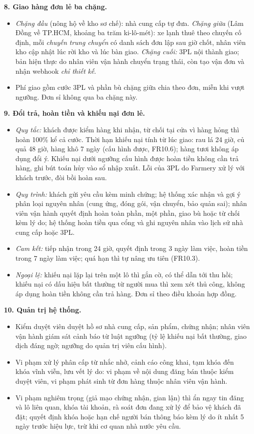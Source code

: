 \noindent\textbf{8. Giao hàng đơn lẻ ba chặng.}
\begin{itemize}
    \item \emph{Chặng đầu} (nông hộ về kho sơ chế): nhà cung cấp tự đưa. \emph{Chặng giữa} (Lâm Đồng về TP.HCM, khoảng ba trăm ki-lô-mét): xe lạnh thuê theo chuyến cố định, mỗi \emph{chuyến trung chuyển} có danh sách đơn lập sau giờ chốt, nhân viên kho cập nhật lúc rời kho và lúc bàn giao. \emph{Chặng cuối:} 3PL nội thành giao; bản hiện thực do nhân viên vận hành chuyển trạng thái, còn tạo vận đơn và nhận webhook \emph{chỉ thiết kế}.
    \item Phí giao gồm cước 3PL và phần bù chặng giữa chia theo đơn, miễn khi vượt ngưỡng. Đơn sỉ không qua ba chặng này.
\end{itemize}

\noindent\textbf{9. Đổi trả, hoàn tiền và khiếu nại đơn lẻ.}
\begin{itemize}
    \item \emph{Quy tắc:} khách được kiểm hàng khi nhận, từ chối tại cửa vì hàng hỏng thì hoàn 100\% kể cả cước. Thời hạn khiếu nại tính từ lúc giao: rau lá 24 giờ, củ quả 48 giờ, hàng khô 7 ngày (cấu hình được, FR10.6); hàng tươi không áp dụng đổi ý. Khiếu nại dưới ngưỡng cấu hình được hoàn tiền không cần trả hàng, ghi bút toán hủy vào sổ nhập xuất. Lỗi của 3PL do Farmery xử lý với khách trước, đòi bồi hoàn sau.
    \item \emph{Quy trình:} khách gửi yêu cầu kèm minh chứng; hệ thống xác nhận và gợi ý phân loại nguyên nhân (cung ứng, đóng gói, vận chuyển, bảo quản sai); nhân viên vận hành quyết định hoàn toàn phần, một phần, giao bù hoặc từ chối kèm lý do; hệ thống hoàn tiền qua cổng và ghi nguyên nhân vào lịch sử nhà cung cấp hoặc 3PL.
    \item \emph{Cam kết:} tiếp nhận trong 24 giờ, quyết định trong 3 ngày làm việc, hoàn tiền trong 7 ngày làm việc; quá hạn thì tự nâng ưu tiên (FR10.3).
    \item \emph{Ngoại lệ:} khiếu nại lặp lại trên một lô thì gắn cờ, có thể dẫn tới thu hồi; khiếu nại có dấu hiệu bất thường từ người mua thì xem xét thủ công, không áp dụng hoàn tiền không cần trả hàng. Đơn sỉ theo điều khoản hợp đồng.
\end{itemize}

\noindent\textbf{10. Quản trị hệ thống.}
\begin{itemize}
    \item Kiểm duyệt viên duyệt hồ sơ nhà cung cấp, sản phẩm, chứng nhận; nhân viên vận hành giám sát cảnh báo từ luật ngưỡng (tỷ lệ khiếu nại bất thường, giao dịch đáng ngờ; ngưỡng do quản trị viên cấu hình).
    \item Vi phạm xử lý phân cấp từ nhắc nhở, cảnh cáo công khai, tạm khóa đến khóa vĩnh viễn, lưu vết lý do: vi phạm về nội dung đăng bán thuộc kiểm duyệt viên, vi phạm phát sinh từ đơn hàng thuộc nhân viên vận hành.
    \item Vi phạm nghiêm trọng (giả mạo chứng nhận, gian lận) thì ẩn ngay tin đăng và lô liên quan, khóa tài khoản, rà soát đơn đang xử lý để bảo vệ khách đã đặt; quyết định khóa hoặc hạn chế người bán thông báo kèm lý do ít nhất 5 ngày trước hiệu lực, trừ khi cơ quan nhà nước yêu cầu.
\end{itemize}


